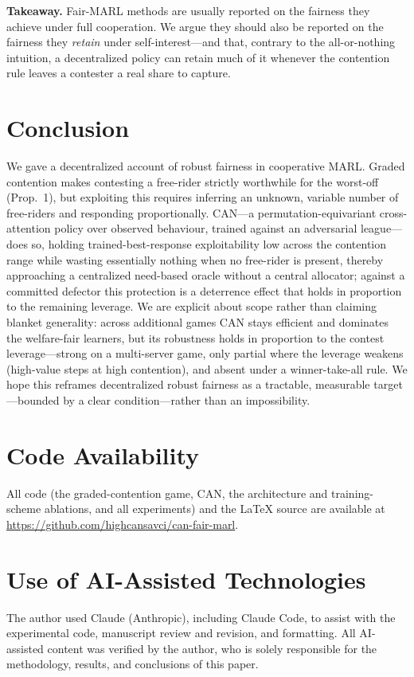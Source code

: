 \documentclass[conference, a4paper]{IEEEtran}
\begin{document}
\textbf{Takeaway.} Fair-MARL methods are usually reported on the fairness they
achieve under full cooperation. We argue they should also be reported on the
fairness they \emph{retain} under self-interest---and that, contrary to the
all-or-nothing intuition, a decentralized policy can retain much of it whenever the
contention rule leaves a contester a real share to capture.

\section{Conclusion}
We gave a decentralized account of robust fairness in cooperative MARL. Graded
contention makes contesting a free-rider strictly worthwhile for the worst-off
(Prop.~1), but exploiting this requires inferring an unknown, variable number of
free-riders and responding proportionally. CAN---a permutation-equivariant
cross-attention policy over observed behaviour, trained against an adversarial
league---does so, holding trained-best-response exploitability low across the
contention range while wasting essentially nothing when no free-rider is
present, thereby approaching a centralized need-based oracle without a central
allocator; against a committed defector this protection is a deterrence effect
that holds in proportion to the remaining leverage. We are explicit about scope rather than claiming blanket generality:
across additional games CAN stays efficient and dominates the welfare-fair learners,
but its robustness holds in proportion to the contest leverage---strong on a
multi-server game, only partial where the leverage weakens (high-value steps at high
contention), and absent under a winner-take-all rule. We hope this reframes
decentralized robust fairness as a tractable, measurable target---bounded by a clear
condition---rather than an impossibility.

\section*{Code Availability}
All code (the graded-contention game, CAN, the architecture and training-scheme
ablations, and all experiments) and the \LaTeX{} source are available at
\url{https://github.com/highcansavci/can-fair-marl}.

\section*{Use of AI-Assisted Technologies}
The author used Claude (Anthropic), including Claude Code, to assist with the
experimental code, manuscript review and revision, and formatting. All AI-assisted
content was verified by the author, who is solely responsible for the methodology,
results, and conclusions of this paper.
\end{document}
